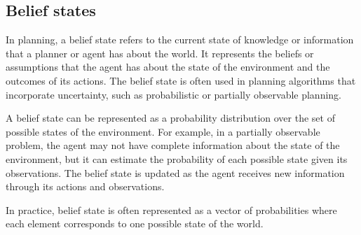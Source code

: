 \documentclass{article}
\begin{document}
\subsection{Belief states}

In planning, a belief state refers to the current state of knowledge or information that a planner or agent has about the world. It represents the beliefs or assumptions that the agent has about the state of the environment and the outcomes of its actions. The belief state is often used in planning algorithms that incorporate uncertainty, such as probabilistic or partially observable planning.

A belief state can be represented as a probability distribution over the set of possible states of the environment. For example, in a partially observable problem, the agent may not have complete information about the state of the environment, but it can estimate the probability of each possible state given its observations. The belief state is updated as the agent receives new information through its actions and observations.

In practice, belief state is often represented as a vector of probabilities where each element corresponds to one possible state of the world.
\end{document}
